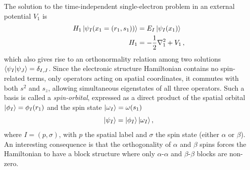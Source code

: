 \documentclass[../main.tex]{subfiles}
\begin{document}
The solution to the time-independent single-electron problem in an external potential $V_1$ is 
\begin{align}
        H_1 \ket{\psi_I(x_1 = (r_1,s_1))} &= E_I \ket{\psi_I(x_1)} \\
        H_1 &= - \frac{1}{2} \nabla^2_1 + V_1 \, ,
\end{align} which also gives rise to an orthonormality relation among two solutions $\braket{\psi_I}{\psi_J} = \delta_{I,J}$. Since the electronic structure Hamiltonian contains no spin-related terms, only operators acting on spatial coordinates, it commutes with both $s^2$ and $s_z$, allowing simultaneous eigenstates of all three operators.
Such a basis is called a \textit{spin-orbital}, expressed as a direct product of the spatial orbital $\ket{\phi_I} = \phi_I(r_1)$ and the spin state $\ket{\omega_I} = \omega(s_1)$
\begin{equation}
    \ket{\psi_I} = \ket{\phi_I}\ket{\omega_I},
\end{equation} where $I = (p, \sigma)$, with $p$ the spatial label and $\sigma$ the spin state (either $\alpha$ or $\beta$). An interesting consequence is that the orthogonality of $\alpha$ and $\beta$ spins forces the Hamiltonian to have a block structure where only $\alpha$-$\alpha$ and $\beta$-$\beta$ blocks are non-zero.
\end{document}
